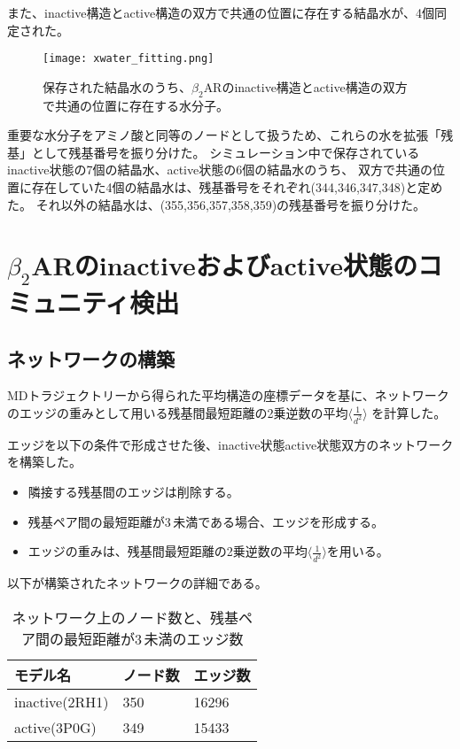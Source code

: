 \newpage

また、inactive構造とactive構造の双方で共通の位置に存在する結晶水が、4個同定された。

\begin{figure}[htbp]
  \centering
  \texttt{[image: xwater\_fitting.png]}
  \caption{保存された結晶水のうち、$\beta_2$ARのinactive構造とactive構造の双方で共通の位置に存在する水分子。}
  \label{fig:xwater_fitting}
\end{figure}

\newpage

重要な水分子をアミノ酸と同等のノードとして扱うため、これらの水を拡張「残基」として残基番号を振り分けた。
シミュレーション中で保存されているinactive状態の7個の結晶水、active状態の6個の結晶水のうち、
双方で共通の位置に存在していた4個の結晶水は、残基番号をそれぞれ(344,346,347,348)と定めた。
それ以外の結晶水は、(355,356,357,358,359)の残基番号を振り分けた。



\section{$\beta_2$ARのinactiveおよびactive状態のコミュニティ検出}

\subsection{ネットワークの構築}

MDトラジェクトリーから得られた平均構造の座標データを基に、ネットワークのエッジの重みとして用いる残基間最短距離の2乗逆数の平均$\langle \frac{1}{d^2} \rangle$ を計算した。

エッジを以下の条件で形成させた後、inactive状態active状態双方のネットワークを構築した。
\begin{itemize}
  \item 隣接する残基間のエッジは削除する。
  \item 残基ペア間の最短距離が3\,\text{\AA}未満である場合、エッジを形成する。
  \item エッジの重みは、残基間最短距離の2乗逆数の平均$\langle \frac{1}{d^2} \rangle$を用いる。
\end{itemize}

以下が構築されたネットワークの詳細である。
\begin{table}[!ht]
    \centering
    \caption{ネットワーク上のノード数と、残基ペア間の最短距離が3\,\text{\AA}未満のエッジ数}
    \begin{tabular}{lll}
      \hline
      モデル名          & ノード数  & エッジ数 \\
      \hline 
      inactive(2RH1)  &  350 &  16296 \\ 
      active(3P0G)    &  349 &  15433 \\ 
    \end{tabular}
    \label{tab:network_size}
  \end{table}

